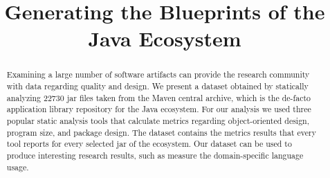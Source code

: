\documentclass[conference]{IEEEtran}
\begin{document}
%
\title{Generating the Blueprints of the Java Ecosystem}

\author{

}

\maketitle

\begin{abstract}
Examining a large number of software artifacts can provide
the research community with data regarding quality and design.
We present a dataset obtained by statically analyzing
22730 {\sc jar} files taken from the Maven
central archive, which is the de-facto application library
repository for the Java ecosystem. For our analysis
we used three popular static analysis tools
that calculate metrics regarding object-oriented design,
program size, and package design.
The dataset contains the metrics results that every tool
reports for every selected {\sc jar} of the
ecosystem. Our dataset can be used to produce interesting
research results, such as measure the domain-specific language usage.
\end{abstract}
\end{document}
